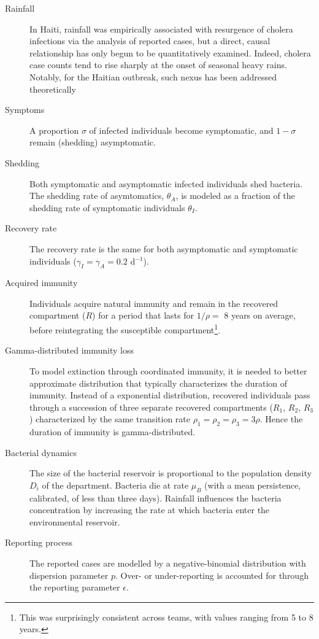 \begin{description}
    \item[Rainfall] In Haiti, rainfall was empirically associated with resurgence of cholera infections via the analysis of reported cases, but a direct, causal relationship has only begun to be quantitatively examined. Indeed, cholera case counts tend to rise sharply at the onset of seasonal heavy rains. Notably, for the Haitian outbreak, such nexus has been addressed theoretically
    \item[Symptoms] A proportion $\sigma$ of infected individuals become symptomatic, and $1-\sigma$ remain (shedding) asymptomatic. 
    \item[Shedding] Both symptomatic and asymptomatic infected individuals shed bacteria. The shedding rate of asymtomatics, $\theta_A$, is modeled as a fraction of the shedding rate of symptomatic individuals  $\theta_I$\cite{Kuhn:GlucoseNotRiceBased:2014}.
    \item[Recovery rate] The recovery rate is the same for both asymptomatic and symptomatic individuals ($\gamma_I=\gamma_A=0.2$ d$^{-1}$)\cite{Kaper:Cholera:1995, Codeco:EndemicEpidemicDynamics:2001}.
    \item[Acquired immunity] Individuals acquire natural immunity and remain in the recovered compartment ($R$) for a period that lasts for $1/\rho=$ 8 years on average, before reintegrating the susceptible compartment\footnote{This was surprisingly consistent across teams, with values ranging from 5 to 8 years.}.
    \item[Gamma-distributed immunity loss] To model extinction through coordinated immunity, it is needed to better approximate distribution that typically characterizes the duration of immunity\cite{King:InapparentInfectionsCholera:2008}. Instead of a exponential distribution, recovered individuals pass through a succession of three separate recovered compartments ($R_1$, $R_2$, $R_3$) characterized by the same transition rate $\rho_1=\rho_2=\rho_3=3\rho$. Hence the duration of immunity is gamma-distributed.
    \item[Bacterial dynamics] The size of the bacterial reservoir is proportional to the population density $D_i$ of the department. Bacteria die at rate $\mu_B$ (with a mean persistence, calibrated, of less than three days). Rainfall influences the bacteria concentration by increasing the rate at which bacteria enter the environmental reservoir.
    \item[Reporting process] The reported cases are modelled by a negative-binomial distribution with dispersion parameter $p$. Over- or under-reporting is accounted for through the reporting parameter $\epsilon$.
\end{description}
    
